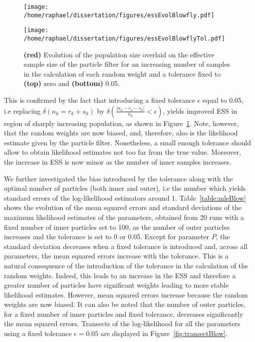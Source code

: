 \documentclass[12pt]{article}
\begin{document}
	\begin{figure}[htb]
		\centering
		\begin{minipage}{0.49\textwidth}
			\centering
			\texttt{[image: /home/raphael/dissertation/figures/essEvolBlowfly.pdf]}
		\end{minipage}
		\begin{minipage}{0.49\textwidth}
			\centering
			\texttt{[image: /home/raphael/dissertation/figures/essEvolBlowflyTol.pdf]}
		\end{minipage}
		\caption[Evolution of the ESS, Nicholson's blowfly model with the number of inner particles and the tolerance level]{\textbf{(red)} Evolution of the population size overlaid on the effective sample size of the particle filter for an increasing number of samples in the calculation of each random weight and a tolerance fixed to \textbf{(top)} zero and \textbf{(bottom)} 0.05.}
		\label{fig:essBlow}
	\end{figure}
\clearpage
\restoregeometry
	This is confirmed by the fact that introducing a fixed tolerance $\epsilon$  equal to 0.05, i.e replacing $\delta(n_k = r_k+s_k)$ by $\delta(\frac{|n_k - r_k-s_k|}{n_k} < \epsilon)$, yields improved ESS in region of sharply increasing population, as shown in Figure~\ref{fig:essBlow}. Note, however, that the random weights are now biased, and, therefore, also is the likelihood estimate given by the particle filter. Nonetheless, a small enough tolerance should allow to obtain likelihood estimates not too far from the true value. Moreover, the increase in ESS is now minor as the number of inner samples increases.
	
	We further investigated the bias introduced by the tolerance along with the optimal number of particles (both inner and outer), i.e the number which yields standard errors of the log-likelihood estimators around 1. Table~\ref{table:mleBlow} shows the evolution of the mean squared errors and standard deviations of the maximum likelihood estimates of the parameters, obtained from 20 runs with a fixed number of inner particles set to 100, as the number of outer particles increases and the tolerance is set to 0 or 0.05. Except for parameter $P$, the standard deviation decreases when a fixed tolerance is introduced and, across all parameters, the mean squared errors increase with the tolerance. This is a natural consequence of the introduction of the tolerance in the calculation of the random weights. Indeed, this leads to an increase in the ESS and therefore a greater number of particles have significant weights leading to more stable likelihood estimates. However, mean squared errors increase because the random weights are now biased. It can also be noted that the number of outer particles, for a fixed number of inner particles and fixed tolerance, decreases significantly the mean squared errors.
	Transects of the log-likelihood for all the parameters using a fixed tolerance $\epsilon=0.05$ are displayed in Figure~\ref{fig:transectBlow}. 
\end{document}
